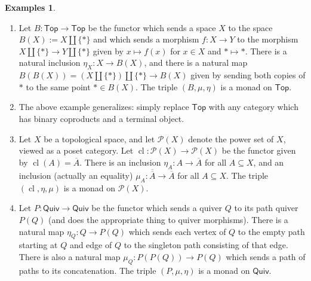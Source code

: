 \documentclass{article}
\theoremstyle{definition}
\newtheorem{examples}{Examples}
\begin{document}
\begin{examples}
\begin{enumerate}[label = \textbf{\Alph*.}]
    \item Let $B : \mathsf{Top} \to \mathsf{Top}$ be the functor which sends a space $X$ to the space $B(X) := X \amalg \{*\}$ and which sends a morphism $f : X \to Y$ to the morphism $X \amalg \{*\} \to Y \amalg \{*\}$ given by $x \mapsto f(x)$ for $x \in X$ and $* \mapsto *$. There is a natural inclusion $\eta_X : X \to B(X)$, and there is a natural map $B(B(X)) = (X \amalg \{*\}) \amalg \{*\} \to B(X)$ given by sending both copies of $*$ to the same point $* \in B(X)$. The triple $(B,\mu,\eta)$ is a monad on $\mathsf{Top}$.
    \item The above example generalizes: simply replace $\mathsf{Top}$ with any category which has binary coproducts and a terminal object.
    \item Let $X$ be a topological space, and let $\mathcal{P}(X)$ denote the power set of $X$, viewed as a poset category. Let $\operatorname{cl} : \mathcal{P}(X) \to \mathcal{P}(X)$ be the functor given by $\operatorname{cl}(A) = \overline{A}$. There is an inclusion $\eta_A : A \to \overline{A}$ for all $A \subseteq X$, and an inclusion (actually an equality) $\mu_A : \overline{\overline{A}} \to \overline{A}$ for all $A \subseteq X$. The triple $(\operatorname{cl}, \eta, \mu)$ is a monad on $\mathcal{P}(X)$.
    \item Let $P : \mathsf{Quiv} \to \mathsf{Quiv}$ be the functor which sends a quiver $Q$ to its path quiver $P(Q)$ (and does the appropriate thing to quiver morphisms). There is a natural map $\eta_Q : Q \to P(Q)$ which sends each vertex of $Q$ to the empty path starting at $Q$ and edge of $Q$ to the singleton path consisting of that edge. There is also a natural map $\mu_Q : P(P(Q)) \to P(Q)$ which sends a path of paths to its concatenation. The triple $(P,\mu,\eta)$ is a monad on $\mathsf{Quiv}$.
\end{enumerate}
\end{examples}
\end{document}
